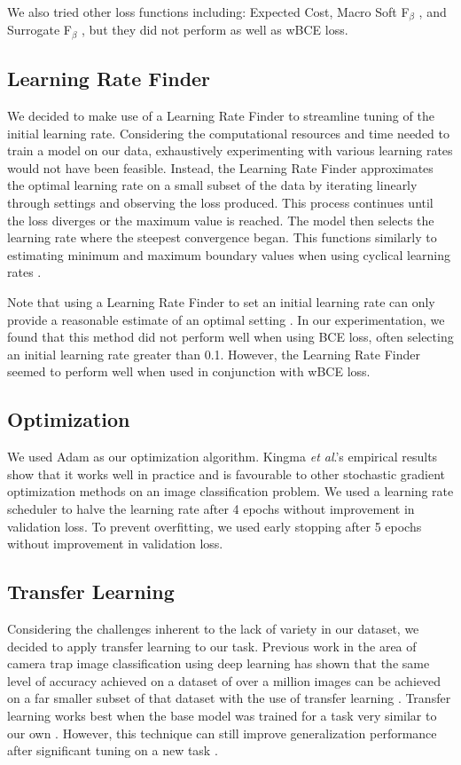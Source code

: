 \documentclass{article}
\begin{document}
 We also tried other loss functions including: Expected Cost, Macro Soft F$_\beta$ \cite{lee2021surrogate}, and Surrogate F$_\beta$ \cite{lee2021surrogate}, but they did not perform as well as wBCE loss.

\subsection{Learning Rate Finder}
We decided to make use of a Learning Rate Finder to streamline tuning of the initial learning rate. Considering the computational resources and time needed to train a model on our data, exhaustively experimenting with various learning rates would not have been feasible. Instead, the Learning Rate Finder approximates the optimal learning rate on a small subset of the data by iterating linearly through settings and observing the loss produced. This process continues until the loss diverges or the maximum value is reached. The model then selects the learning rate where the steepest convergence began. This functions similarly to estimating minimum and maximum boundary values when using cyclical learning rates \cite{Smith:2017}.

Note that using a Learning Rate Finder to set an initial learning rate can only provide a reasonable estimate of an optimal setting \cite{Smith:2017}. In our experimentation, we found that this method did not perform well when using BCE loss, often selecting an initial learning rate greater than 0.1. However, the Learning Rate Finder seemed to perform well when used in conjunction with wBCE loss.

\subsection{Optimization}
We used Adam as our optimization algorithm. Kingma \textit{et al}.'s \cite{kingma2017adam} empirical results show that it works well in
practice and is favourable to other stochastic gradient optimization methods on an image classification problem. We used a learning rate scheduler to halve the learning rate after 4 epochs without improvement in validation loss. To prevent overfitting, we used early stopping after 5 epochs without improvement in validation loss.

\subsection{Transfer Learning}
Considering the %
challenges inherent to the lack of variety in our dataset, we decided to apply transfer learning to our task. Previous work in the area of camera trap image classification using deep learning has shown that the same level of accuracy achieved on a dataset of over a million images can be achieved on a far smaller subset of that dataset with the use of transfer learning \cite{Norouzzadeh2018}. Transfer learning works best when the base model was trained for a task very similar to our own \cite{Yosinski2014}. However, this technique can still improve generalization performance after significant tuning on a new task \cite{Yosinski2014}. 
\end{document}
